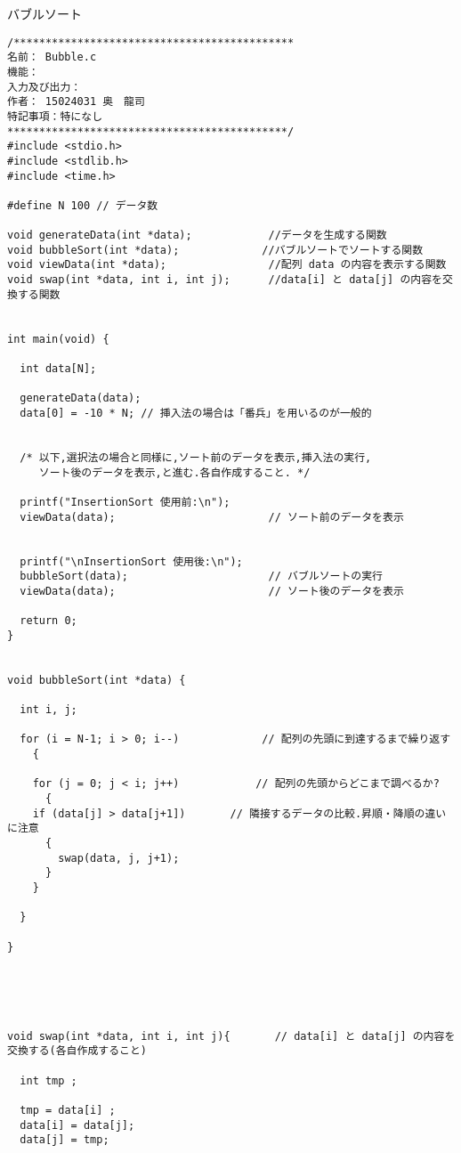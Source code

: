 \documentclass[a4j,titlepage]{jarticle}
\begin{document}
\begin{breakitembox}[l]{バブルソート} \small
\begin{verbatim}
/********************************************
名前： Bubble.c
機能： 
入力及び出力： 
作者： 15024031 奥　龍司
特記事項：特になし
********************************************/
#include <stdio.h>
#include <stdlib.h>
#include <time.h>

#define N 100 // データ数

void generateData(int *data);            //データを生成する関数
void bubbleSort(int *data);             //バブルソートでソートする関数
void viewData(int *data);                //配列 data の内容を表示する関数
void swap(int *data, int i, int j);      //data[i] と data[j] の内容を交換する関数


int main(void) {
  
  int data[N];
  
  generateData(data);
  data[0] = -10 * N; // 挿入法の場合は「番兵」を用いるのが一般的

  
  /* 以下,選択法の場合と同様に,ソート前のデータを表示,挿入法の実行,
     ソート後のデータを表示,と進む.各自作成すること. */

  printf("InsertionSort 使用前:\n");
  viewData(data);                        // ソート前のデータを表示
  

  printf("\nInsertionSort 使用後:\n");
  bubbleSort(data);                      // バブルソートの実行
  viewData(data);                        // ソート後のデータを表示
  
  return 0;
}


void bubbleSort(int *data) {
  
  int i, j;
  
  for (i = N-1; i > 0; i--)             // 配列の先頭に到達するまで繰り返す
    { 
    
    for (j = 0; j < i; j++)            // 配列の先頭からどこまで調べるか?
      {             
	if (data[j] > data[j+1])       // 隣接するデータの比較.昇順・降順の違いに注意
	  {
	    swap(data, j, j+1);
	  }
    }
    
  }
   
}





void swap(int *data, int i, int j){       // data[i] と data[j] の内容を交換する(各自作成すること)

  int tmp ;

  tmp = data[i] ;
  data[i] = data[j];
  data[j] = tmp;
    

\end{verbatim}
\end{breakitembox}
\end{document}
